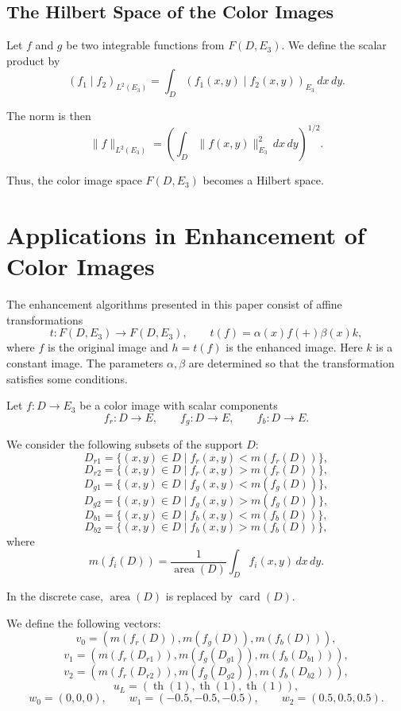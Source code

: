 \documentclass[11pt]{article}
\begin{document}
\subsection{The Hilbert Space of the Color Images}

Let $f$ and $g$ be two integrable functions from $F(D,E_3)$. We define the scalar product by
\begin{equation}
(f_1\mid f_2)_{L^2(E_3)}=\int_D (f_1(x,y)\mid f_2(x,y))_{E_3}\,dx\,dy.
\end{equation}

The norm is then
\begin{equation}
\|f\|_{L^2(E_3)}=
\left(\int_D \|f(x,y)\|_{E_3}^2\,dx\,dy\right)^{1/2}.
\end{equation}

Thus, the color image space $F(D,E_3)$ becomes a Hilbert space.

\section{Applications in Enhancement of Color Images}

The enhancement algorithms presented in this paper consist of affine transformations
\begin{equation}
t:F(D,E_3)\to F(D,E_3), \qquad t(f)=\alpha(x)f(+)\beta(x)k,
\end{equation}
where $f$ is the original image and $h=t(f)$ is the enhanced image. Here $k$ is a constant image. The parameters $\alpha,\beta$ are determined so that the transformation satisfies some conditions.

Let $f:D\to E_3$ be a color image with scalar components
\[
f_r:D\to E,\qquad f_g:D\to E,\qquad f_b:D\to E.
\]

We consider the following subsets of the support $D$:
\[
D_{r1}=\{(x,y)\in D \mid f_r(x,y)<m(f_r(D))\},
\]
\[
D_{r2}=\{(x,y)\in D \mid f_r(x,y)>m(f_r(D))\},
\]
\[
D_{g1}=\{(x,y)\in D \mid f_g(x,y)<m(f_g(D))\},
\]
\[
D_{g2}=\{(x,y)\in D \mid f_g(x,y)>m(f_g(D))\},
\]
\[
D_{b1}=\{(x,y)\in D \mid f_b(x,y)<m(f_b(D))\},
\]
\[
D_{b2}=\{(x,y)\in D \mid f_b(x,y)>m(f_b(D))\},
\]
where
\begin{equation}
m(f_i(D))=\frac{1}{\operatorname{area}(D)}\int_D f_i(x,y)\,dx\,dy.
\end{equation}

In the discrete case, $\operatorname{area}(D)$ is replaced by $\operatorname{card}(D)$.

We define the following vectors:
\[
v_0=(m(f_r(D)),m(f_g(D)),m(f_b(D))),
\]
\[
v_1=(m(f_r(D_{r1})),m(f_g(D_{g1})),m(f_b(D_{b1}))),
\]
\[
v_2=(m(f_r(D_{r2})),m(f_g(D_{g2})),m(f_b(D_{b2}))),
\]
\[
u_L=(\operatorname{th}(1),\operatorname{th}(1),\operatorname{th}(1)),
\]
\[
w_0=(0,0,0), \qquad w_1=(-0.5,-0.5,-0.5), \qquad w_2=(0.5,0.5,0.5).
\]
\end{document}
